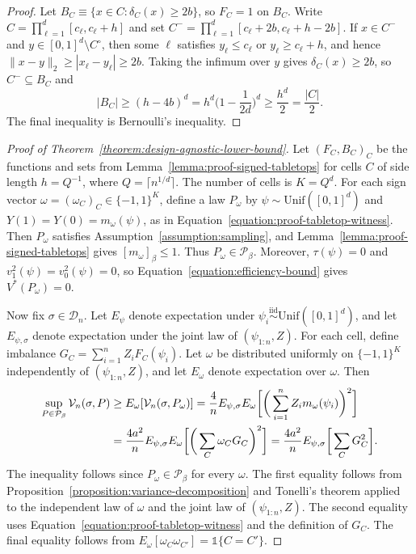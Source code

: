 \documentclass[letterpaper,12pt]{article}
\theoremstyle{definition}
\numberwithin{equation}{section}
\newcommand{\mc}{\mathcal}
\newcommand{\one}{\mathds{1}}
\newcommand{\simiid}{\stackrel{\mathrm{iid}}{\sim}}
\begin{document}
\begin{proof}
Let $B_C\equiv\{x\in C:\delta_C(x)\geq2b\}$, so $F_C=1$ on $B_C$.
Write $C=\prod_{\ell=1}^d[c_\ell,c_\ell+h]$ and set $C^-=\prod_{\ell=1}^d[c_\ell+2b,c_\ell+h-2b]$.
If $x\in C^-$ and $y\in[0,1]^d\setminus C^\circ$, then some $\ell$ satisfies $y_\ell\leq c_\ell$ or $y_\ell\geq c_\ell+h$, and hence $\|x-y\|_2\geq|x_\ell-y_\ell|\geq2b$.
Taking the infimum over $y$ gives $\delta_C(x)\geq2b$, so $C^-\subseteq B_C$ and
\begin{equation*}
|B_C|\geq(h-4b)^d=h^d\bigg(1-\frac{1}{2d}\bigg)^d\geq\frac{h^d}{2}=\frac{|C|}{2}.
\end{equation*}
The final inequality is Bernoulli's inequality.
\end{proof}

\begin{proof}[Proof of Theorem~\ref{theorem:design-agnostic-lower-bound}]
Let $(F_C,B_C)_C$ be the functions and sets from Lemma~\ref{lemma:proof-signed-tabletops} for cells $C$ of side length $h=Q^{-1}$, where $Q=\lceil n^{1/d}\rceil$.
The number of cells is $K=Q^d$.
For each sign vector $\omega=(\omega_C)_C\in\{-1,1\}^K$, define a law $P_\omega$ by $\psi\sim\mathrm{Unif}([0,1]^d)$ and $Y(1)=Y(0)=m_\omega(\psi)$, as in Equation~\eqref{equation:proof-tabletop-witness}.
Then $P_\omega$ satisfies Assumption~\ref{assumption:sampling}, and Lemma~\ref{lemma:proof-signed-tabletops} gives $[m_\omega]_\beta\leq1$.
Thus $P_\omega\in\mathcal P_\beta$.
Moreover, $\tau(\psi)=0$ and $v_1^2(\psi)=v_0^2(\psi)=0$, so Equation~\eqref{equation:efficiency-bound} gives $V^*(P_\omega)=0$.

Now fix $\sigma\in\mathcal D_n$.
Let $E_\psi$ denote expectation under $\psi_i\simiid\mathrm{Unif}([0,1]^d)$, and let $E_{\psi,\sigma}$ denote expectation under the joint law of $(\psi_{1:n},Z)$.
For each cell, define imbalance $G_C=\sum_{i=1}^nZ_iF_C(\psi_i)$.
Let $\omega$ be distributed uniformly on $\{-1,1\}^K$ independently of $(\psi_{1:n},Z)$, and let $E_\omega$ denote expectation over $\omega$.
Then
\begin{align}
\sup_{P\in\mathcal P_\beta}\mc V_n(\sigma,P)&\geq E_\omega[\mc V_n(\sigma,P_\omega)]=\frac4nE_{\psi,\sigma} E_\omega\bigg[\bigg(\sum_{i=1}^nZ_im_\omega(\psi_i)\bigg)^2\bigg]\notag\\
&=\frac{4a^2}{n}E_{\psi,\sigma} E_\omega\bigg[\bigg(\sum_C\omega_CG_C\bigg)^2\bigg]=\frac{4a^2}{n}E_{\psi,\sigma}\bigg[\sum_CG_C^2\bigg]. \label{equation:proof-bump-prior-average}
\end{align}
The inequality follows since $P_\omega\in\mathcal P_\beta$ for every $\omega$.
The first equality follows from Proposition~\ref{proposition:variance-decomposition} and Tonelli's theorem applied to the independent law of $\omega$ and the joint law of $(\psi_{1:n},Z)$.
The second equality uses Equation~\eqref{equation:proof-tabletop-witness} and the definition of $G_C$.
The final equality follows from $E_\omega[\omega_C\omega_{C'}]=\one\{C=C'\}$.


\end{proof}
\end{document}
